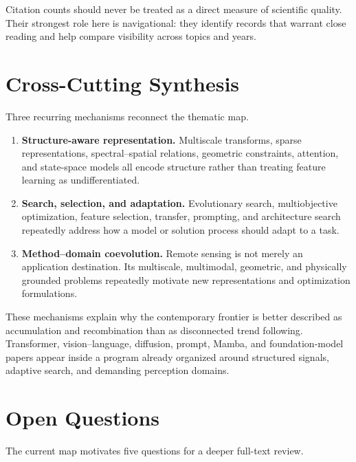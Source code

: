 \documentclass[11pt]{article}
\begin{document}
Citation counts should never be treated as a direct measure of scientific
quality. Their strongest role here is navigational: they identify records that
warrant close reading and help compare visibility across topics and years.

\section{Cross-Cutting Synthesis}

Three recurring mechanisms reconnect the thematic map.

\begin{enumerate}
\item \textbf{Structure-aware representation.} Multiscale transforms, sparse
representations, spectral--spatial relations, geometric constraints, attention,
and state-space models all encode structure rather than treating feature
learning as undifferentiated.
\item \textbf{Search, selection, and adaptation.} Evolutionary search,
multiobjective optimization, feature selection, transfer, prompting, and
architecture search repeatedly address how a model or solution process should
adapt to a task.
\item \textbf{Method--domain coevolution.} Remote sensing is not merely an
application destination. Its multiscale, multimodal, geometric, and physically
grounded problems repeatedly motivate new representations and optimization
formulations.
\end{enumerate}

These mechanisms explain why the contemporary frontier is better described as
accumulation and recombination than as disconnected trend following.
Transformer, vision--language, diffusion, prompt, Mamba, and foundation-model
papers appear inside a program already organized around structured signals,
adaptive search, and demanding perception domains.

\section{Open Questions}

The current map motivates five questions for a deeper full-text review.
\end{document}
